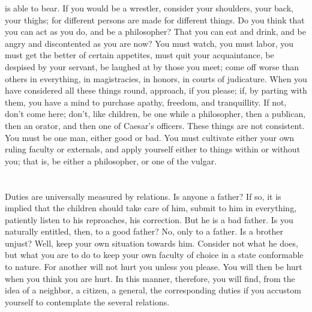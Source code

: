 \documentclass[12pt]{article}
\begin{document}
is able to bear. If you would be a wrestler, consider your shoulders,
your back, your thighs; for different persons are made for different
things. Do you think that you can act as you do, and be a philosopher?
That you can eat and drink, and be angry and discontented as you are
now? You must watch, you must labor, you must get the better of certain
appetites, must quit your acquaintance, be despised by your servant,
be laughed at by those you meet; come off worse than others in everything,
in magistracies, in honors, in courts of judicature. When you have
considered all these things round, approach, if you please; if, by
parting with them, you have a mind to purchase apathy, freedom, and
tranquillity. If not, don't come here; don't, like children, be one
while a philosopher, then a publican, then an orator, and then one
of Caesar's officers. These things are not consistent. You must be
one man, either good or bad. You must cultivate either your own ruling
faculty or externals, and apply yourself either to things within or
without you; that is, be either a philosopher, or one of the vulgar.

\section{}

Duties are universally measured by relations. Is anyone a father?
If so, it is implied that the children should take care of him, submit
to him in everything, patiently listen to his reproaches, his correction.
But he is a bad father. Is you naturally entitled, then, to a good
father? No, only to a father. Is a brother unjust? Well, keep your
own situation towards him. Consider not what he does, but what you
are to do to keep your own faculty of choice in a state conformable
to nature. For another will not hurt you unless you please. You will
then be hurt when you think you are hurt. In this manner, therefore,
you will find, from the idea of a neighbor, a citizen, a general,
the corresponding duties if you accustom yourself to contemplate the
several relations. 

\section{}
\end{document}
